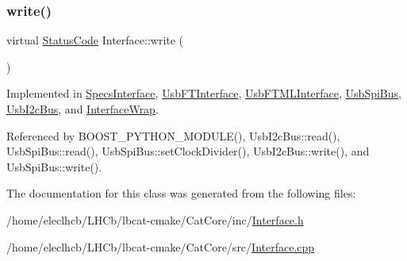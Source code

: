 \subsubsection{\texorpdfstring{write()}{write()}}
{\footnotesize\ttfamily virtual \hyperlink{classStatusCode}{Status\+Code} Interface\+::write (\begin{DoxyParamCaption}\item[{\hyperlink{classIOdata}{I\+Odata} $\ast$}]{ }\end{DoxyParamCaption})\hspace{0.3cm}{\ttfamily [pure virtual]}}



Implemented in \hyperlink{classSpecsInterface_a33c7224b61bbb8d1ef20680f570ba4bd}{Specs\+Interface}, \hyperlink{classUsbFTInterface_a059296c0d7e5118f975f1dfa2e1f3fbb}{Usb\+F\+T\+Interface}, \hyperlink{classUsbFTMLInterface_aa801e8875661d73b2afe25cb1fb94a94}{Usb\+F\+T\+M\+L\+Interface}, \hyperlink{classUsbSpiBus_a3ac9d6f5053ddb8b2f8336f2aa88934e}{Usb\+Spi\+Bus}, \hyperlink{classUsbI2cBus_a3f94dd5ab9594a1f69be7869c41c8bc8}{Usb\+I2c\+Bus}, and \hyperlink{structInterfaceWrap_afbf6658c8be109e72f38d61438ec94d3}{Interface\+Wrap}.



Referenced by B\+O\+O\+S\+T\+\_\+\+P\+Y\+T\+H\+O\+N\+\_\+\+M\+O\+D\+U\+L\+E(), Usb\+I2c\+Bus\+::read(), Usb\+Spi\+Bus\+::read(), Usb\+Spi\+Bus\+::set\+Clock\+Divider(), Usb\+I2c\+Bus\+::write(), and Usb\+Spi\+Bus\+::write().



The documentation for this class was generated from the following files\+:\begin{DoxyCompactItemize}
\item 
/home/eleclhcb/\+L\+H\+Cb/lbcat-\/cmake/\+Cat\+Core/inc/\hyperlink{Interface_8h}{Interface.\+h}\item 
/home/eleclhcb/\+L\+H\+Cb/lbcat-\/cmake/\+Cat\+Core/src/\hyperlink{Interface_8cpp}{Interface.\+cpp}\end{DoxyCompactItemize}
